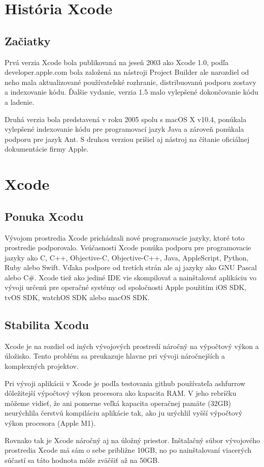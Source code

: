 \documentclass[12pt]{article}
\begin{document}
	\newpage
		\section{História Xcode}
		\subsection{Začiatky}
			Prvá verzia Xcode bola publikovaná na jeseň 2003 ako Xcode 1.0,  podľa developer.apple.com bola založená na nástroji Project Builder ale narozdiel od neho mala aktualizované používateľské rozhranie,  distribuovanú podporu zostavy a indexovanie kódu.  Ďalšie vydanie,  verzia 1.5 malo vylepšené dokončovanie kódu a ladenie.  \cite{xcodewiki} \par
			Druhá verzia bola predstavená v roku 2005 spolu s macOS X v10.4,  ponúkala vylepšené indexovanie kódu pre programovací jazyk Java a zároveň ponúkala podporu pre jazyk Ant.  S druhou verziou prišiel aj nástroj na čítanie oficiálnej dokumentácie firmy Apple.  \cite{xcodewiki}

	\newpage
		\section{Xcode}
		\subsection{Ponuka Xcodu}
			Vývojom prostredia Xcode prichádzali nové programovacie jazyky,  ktoré toto prostredie podporovalo.  Vsúčasnosti Xcode ponúka podporu pre programovacie jazyky ako C,  C++,  Objective-C,  Objective-C++,  Java,  AppleScript,  Python,  Ruby alebo Swift.  Vďaka podpore od tretích strán ale aj jazyky ako GNU Pascal alebo C\#.  Xcode tiež ako jediné IDE vie skompilovať a nainštalovať aplikáciu vo vývoji určenú pre operačné systémy od spoločnosti Apple použitím iOS SDK,  tvOS SDK,  watchOS SDK alebo macOS SDK.  \cite{xcodewiki}

		\subsection{Stabilita Xcodu}
			Xcode je na rozdiel od iných vývojových prostredí náročný na výpočtový výkon a úložisko.  Tento problém sa preukazuje hlavne pri vývoji náročnejších a komplexných projektov.  \par
			Pri vývoji aplikácii v Xcode je podľa testovania github používateľa ashfurrow \cite{ashfurrow} dôležitejší výpočtový výkon procesora ako kapacita RAM.  V jeho rebríčku môžeme vidieť, že ani pomerne veľká kapacita operačnej pamäte (32GB) neurýchlila čerstvú kompiláciu aplikácie tak,  ako ju urýchlil vyšší výpočtový výkon procesora (Apple M1).  \par
			Rovnako tak je Xcode náročný aj na úložný priestor.  Inštalačný súbor vývojového prostredia Xcode má sám o sebe približne 10GB,  no po nainštalovaní viacerých súčastí sa táto hodnota môže zväčšiť až na 50GB.
\end{document}
